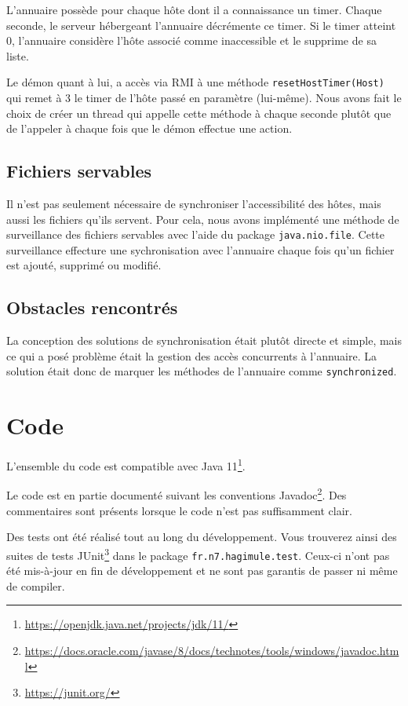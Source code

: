 \documentclass[french]{template}
\begin{document}
L'annuaire possède pour chaque hôte dont il a connaissance un timer. Chaque seconde, le serveur hébergeant l'annuaire décrémente ce timer. Si le timer atteint 0, l'annuaire considère l'hôte associé comme inaccessible et le supprime de sa liste.

Le démon quant à lui, a accès via RMI à une méthode \texttt{resetHostTimer(Host)} qui remet à 3 le timer de l'hôte passé en paramètre (lui-même). Nous avons fait le choix de créer un thread qui appelle cette méthode à chaque seconde plutôt que de l'appeler à chaque fois que le démon effectue une action.

\subsection{Fichiers servables}

Il n'est pas seulement nécessaire de synchroniser l'accessibilité des hôtes, mais aussi les fichiers qu'ils servent. Pour cela, nous avons implémenté une méthode de surveillance des fichiers servables avec l'aide du package \texttt{java.nio.file}. Cette surveillance effecture une sychronisation avec l'annuaire chaque fois qu'un fichier est ajouté, supprimé ou modifié.

\subsection{Obstacles rencontrés}

La conception des solutions de synchronisation était plutôt directe et simple, mais ce qui a posé problème était la gestion des accès concurrents à l'annuaire. La solution était donc de marquer les méthodes de l'annuaire comme \texttt{synchronized}.

\section{Code}

L'ensemble du code est compatible avec Java 11\footnote{\url{https://openjdk.java.net/projects/jdk/11/}}.

Le code est en partie documenté suivant les conventions Javadoc\footnote{\url{https://docs.oracle.com/javase/8/docs/technotes/tools/windows/javadoc.html}}. Des commentaires sont présents lorsque le code n'est pas suffisamment clair.

Des tests ont été réalisé tout au long du développement. Vous trouverez ainsi des suites de tests JUnit\footnote{\url{https://junit.org/}} dans le package \texttt{fr.n7.hagimule.test}. Ceux-ci n'ont pas été mis-à-jour en fin de développement et ne sont pas garantis de passer ni même de compiler.
\end{document}
